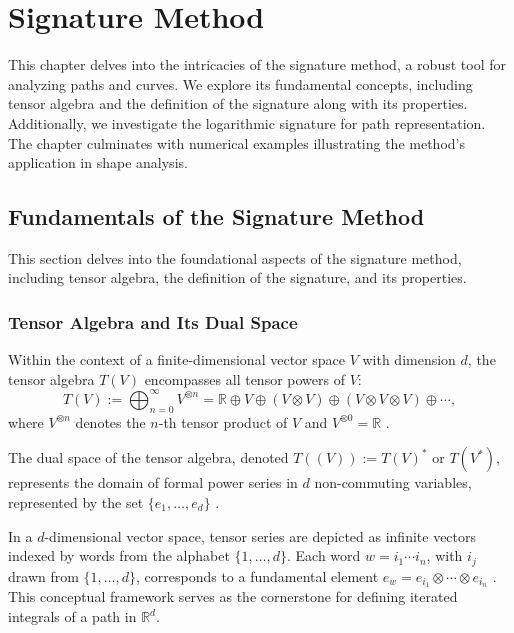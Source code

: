 \chapter{Signature Method}   
\label{ch:signature-method}

This chapter delves into the intricacies of the signature method, a robust tool for analyzing paths and curves. We explore its fundamental concepts, including tensor algebra and the definition of the signature along with its properties. Additionally, we investigate the logarithmic signature for path representation. The chapter culminates with numerical examples illustrating the method's application in shape analysis.

\section{Fundamentals of the Signature Method}
\label{sec:signature-fundamentals}

This section delves into the foundational aspects of the signature method, including tensor algebra, the definition of the signature, and its properties.

\subsection{Tensor Algebra and Its Dual Space}
\label{subsec:tensor-algebra}

Within the context of a finite-dimensional vector space \(V\) with dimension \(d\), the tensor algebra \(T(V)\) encompasses all tensor powers of \(V\):
\begin{equation}
    T(V) := \bigoplus_{n=0}^{\infty} V^{\otimes n} = \mathbb{R} \oplus V \oplus (V \otimes V) \oplus (V \otimes V \otimes V) \oplus \cdots,
\end{equation}
where \(V^{\otimes n}\) denotes the \(n\)-th tensor product of \(V\) and \(V^{\otimes 0} = \mathbb{R}\) \cite{chenAlgebrasIteratedPath1971}.

The dual space of the tensor algebra, denoted \(T((V)) := T(V)^*\) or \(T(V^*)\), represents the domain of formal power series in \(d\) non-commuting variables, represented by the set \(\{e_1, \ldots, e_d\}\) \cite{chenIntegrationPathsGeometric1957}.

In a \(d\)-dimensional vector space, tensor series are depicted as infinite vectors indexed by words from the alphabet \(\{1, \ldots, d\}\). Each word \(w = i_1 \cdots i_n\), with \(i_j\) drawn from \(\{1, \ldots, d\}\), corresponds to a fundamental element \(e_w = e_{i_1} \otimes \cdots \otimes e_{i_n}\) \cite{chevyrevPrimerSignatureMethod2016}. This conceptual framework serves as the cornerstone for defining iterated integrals of a path in \(\mathbb{R}^d\).

